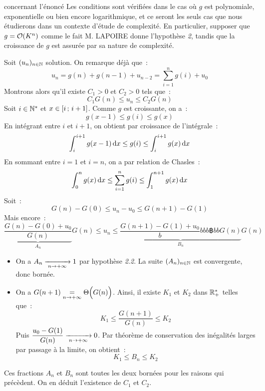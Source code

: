 \begin{remarque}{}{concernant l'énoncé}
    Les conditions sont vérifiées dans le cas où $g$ est polynomiale, exponentielle ou bien encore logarithmique, et ce seront les seuls cas que nous étudierons dans un contexte d'étude de complexité.
    En particulier, supposer que $g = \mathcal{O}(K^n)$ comme le fait M. LAPOIRE donne l'hypothèse \textit{2}, tandis que la croissance de $g$ est assurée par sa nature de complexité.
    
\end{remarque}

\begin{demonstrationbreak}
    Soit $(u_n)_{n \in \mathbb{N}}$ solution. On remarque déjà que~:
    $$u_n = g(n) + g(n-1) + u_{n-2} = \sum_{i=1}^{n} g(i) + u_0$$
    Montrons alors qu'il existe $C_1 > 0$ et $C_2 > 0$ tels que~:
    $$C_1 G(n) \leq u_n \leq C_2 G(n)$$
    Soit $i \in \mathbb{N}^*$ et $x \in [i\, ; \, i+1]$. Comme $g$ est croissante, on a~:
    $$g(x-1) \leq g(i) \leq g(x)$$
    En intégrant entre $i$ et $i+1$, on obtient par croissance de l'intégrale~:
    $$\int_{i}^{i+1} g(x-1) \,\mathrm{d}x \leq g(i) \leq \int_{i}^{i+1} g(x) \,\mathrm{d}x$$
    En sommant entre $i=1$ et $i=n$, on a par relation de Chasles~:
    $$\int_{0}^{n} g(x) \,\mathrm{d}x \leq \sum_{i=1}^{n} g(i) \leq \int_{1}^{n+1} g(x) \,\mathrm{d}x$$
    Soit~:
    $$ G(n) - G(0) \leq u_n - u_{0} \leq G(n+1) - G(1)$$
    Mais encore~:
    $$ \underbrace{\frac{G(n) - G(0) + u_{0}}{G(n)}}_{A_n}G(n) \leq u_{n} \leq \underbrace{\frac{G(n+1) - G(1) + u_{0}} bbbb฿b b{G(n)}}_{B_n}G(n)$$
    \begin{itemize}
        \item On a $A_n \xrightarrow[\;n \to + \infty\;]{} 1$ par hypothèse \textit{2.2}. La suite $(A_n)_{n \in \mathbb{N}}$ est convergente, donc bornée.
        \item On a $G(n+1) \underset{n \to + \infty}{\overset{{}}{=}} \Theta\Big(G(n)\Big)$. Ainsi, il existe $K_1$ et $K_2$ dans $\mathbb{R}_+^*$ telles que~:
        $$K_1 \leq \frac{G(n+1)}{G(n)} \leq K_2$$
        Puis $\displaystyle\frac{u_0 - G(1)}{G(n)} \xrightarrow[\;n\to + \infty\;]{}0$. Par théorème de conservation des inégalités larges par passage à la limite, on obtient~:
        $$K_1 \leq B_n \leq K_2$$
    \end{itemize}
    Ces fractions $A_n$ et $B_n$ sont toutes les deux bornées pour les raisons qui précèdent. On en déduit l'existence de $C_1$ et $C_2$.
\end{demonstrationbreak}

